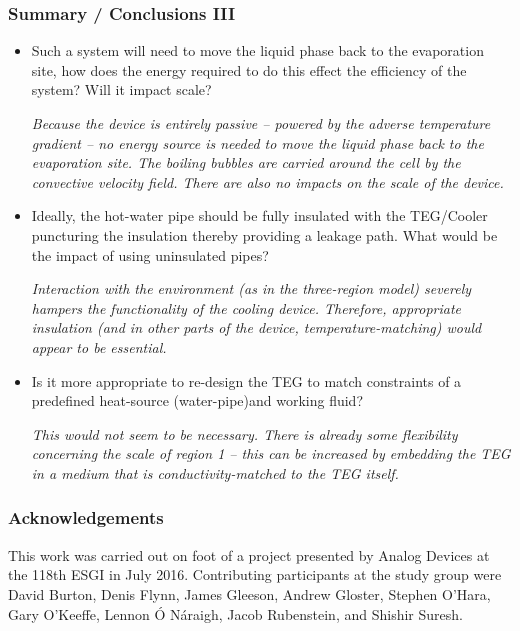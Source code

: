 \documentclass[10pt,mathserif]{beamer}
\begin{document}
\begin{frame}
\frametitle{Summary / Conclusions III}

%

\begin{itemize}[<+>]

\item{ Such a system will need to move the liquid phase back to the
evaporation site, how does the energy required to do this effect
the efficiency of the system? Will it impact scale?

{\emph{Because the device is entirely passive -- powered by the adverse temperature gradient -- no energy source is needed to move the liquid phase back to the evaporation site.  The boiling bubbles are carried around the cell by the convective velocity field.  There are also no impacts on the scale of the device.}}
}

\item{ Ideally, the hot-water pipe should be fully insulated with the
TEG/Cooler puncturing the insulation thereby providing a leakage path. What would be the impact of using
uninsulated pipes?

{\emph{Interaction with the environment (as in the three-region model) severely hampers the functionality of the cooling device.  Therefore, appropriate insulation (and in other parts of the device, temperature-matching) would appear to be essential.}}
}

\item{Is it more appropriate to re-design the TEG to match constraints
of a predefined heat-source (water-pipe)and working fluid?

{\emph{This would not seem to be necessary.  There is already some flexibility concerning the scale of region 1 -- this can be increased by embedding the TEG in a medium that is conductivity-matched to the TEG itself.}}
}
\end{itemize}
\end{frame}

\begin{frame}
\frametitle{Acknowledgements}
This work was carried out on foot of a project presented by Analog Devices at the 118th ESGI in July 2016.  Contributing participants at the study group were 
%
David Burton, 
Denis Flynn, 
James Gleeson, 
Andrew Gloster, 
Stephen O'Hara, 
Gary O'Keeffe, 
Lennon \'O N\'araigh, 
Jacob Rubenstein, and 
Shishir Suresh.
\end{frame}
\end{document}
